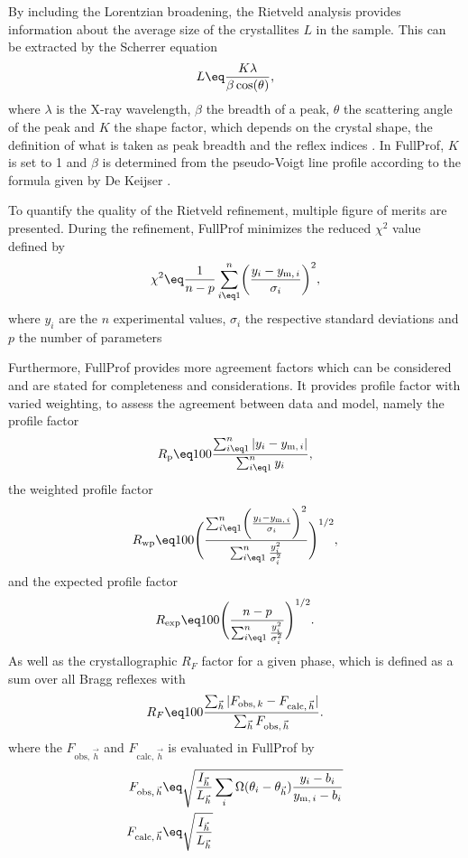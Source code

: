 \documentclass[\main/dresen_thesis.tex]{subfiles}
\begin{document}
    By including the Lorentzian broadening, the Rietveld analysis provides information about the average size of the crystallites $L$ in the sample.
    This can be extracted by the Scherrer equation
    \begin{equation}
      L \eq \frac{K \lambda}{\beta \cos(\theta)},
    \end{equation}
    where $\lambda$ is the X-ray wavelength, $\beta$ the breadth of a peak, $\theta$ the scattering angle of the peak and $K$ the shape factor, which depends on the crystal shape, the definition of what is taken as peak breadth and the reflex indices \cite{Langford_1978_Scher}.
    In FullProf, $K$ is set to 1 and $\beta$ is determined from the pseudo-Voigt line profile according to the formula given by De Keijser \cite{DeKeijser_1982_Useof}.

    To quantify the quality of the Rietveld refinement, multiple figure of merits are presented.
    During the refinement, FullProf minimizes the reduced $\chi^2$ value defined by
    \begin{align}
      \chi^2 \eq \frac{1}{n-p} \sum_{i \eq 1}^n \biggl(\frac{y_i - y_{\mathrm{m},\,i}}{\sigma_i}\biggr)^2,
    \end{align}
    where $y_i$ are the $n$ experimental values, $\sigma_i$ the respective standard deviations and $p$ the number of parameters

    Furthermore, FullProf provides more agreement factors which can be considered and are stated for completeness and considerations.
    It provides profile factor with varied weighting, to assess the agreement between data and model, namely the profile factor
    \begin{align}
      R_\mathrm{p} \eq 100 \frac{\sum_{i\eq1}^n |y_i - y_{\mathrm{m},\,i}|}{\sum_{i\eq1}^n y_i},
    \end{align}
    the weighted profile factor
    \begin{align}
      R_{\mathrm{wp}} \eq 100 \Biggl( \frac{\sum_{i \eq 1}^n \biggl(\frac{y_i - y_{\mathrm{m},\,i}}{\sigma_i}\biggr)^2}{\sum_{i\eq1}^n \frac{y_i^2}{\sigma_i^2}} \Biggr)^{1/2},
    \end{align}
    and the expected profile factor
    \begin{align}
      R_{\mathrm{exp}} \eq 100 \Biggl( \frac{n-p}{ \sum_{i\eq1}^n \frac{y_i^2}{\sigma_i^2} } \Biggr)^{1/2}.
    \end{align}
    As well as the crystallographic $R_F$ factor for a given phase, which is defined as a sum over all Bragg reflexes with
    \begin{align}
      R_F \eq 100
        \frac{\sum_{\vec{h}} |F_{\mathrm{obs},\, k} - F_{\mathrm{calc},\,\vec{h}}|}
             {\sum_{\vec{h}} F_{\mathrm{obs},\, \vec{h}}}.
    \end{align}
    where the $F_{\mathrm{obs},\, \vec{h}}$ and $F_{\mathrm{calc},\,\vec{h}}$ is evaluated in FullProf by
    \begin{align}
      F_{ \mathrm{obs}, \, \vec{h} } &\eq
      \sqrt{ \frac{I_{\vec{h}}}{L_{\vec{h}}} \sum_{i} \Omega(\theta_i - \theta_{\vec{h}}) \frac{y_{i} - b_i}{y_{\mathrm{m},\,i} - b_i} } \\
      F_{\mathrm{calc},\,\vec{h}} &\eq \sqrt{\frac{I_{\vec{h}}}{L_{\vec{h}}}}
    \end{align}
\end{document}
